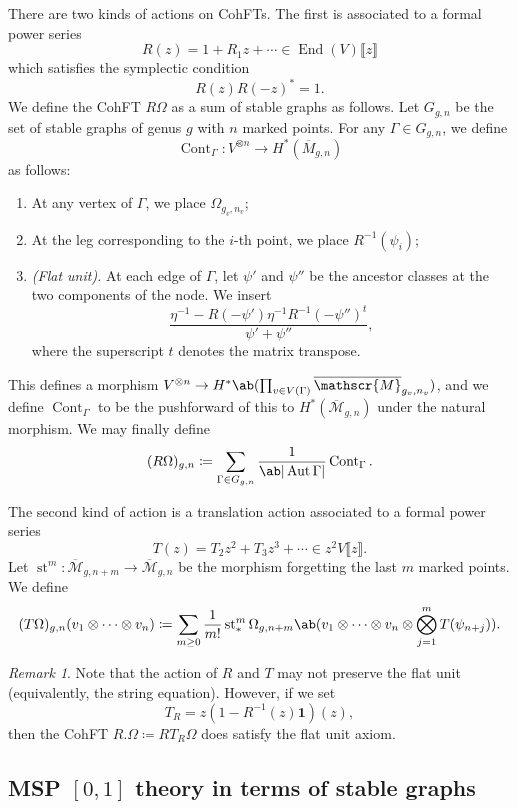 \documentclass[10pt]{amsart}
\theoremstyle{definition}
\theoremstyle{remark}
\newtheorem{rmk}[thm]{Remark}
\theoremstyle{plain}
\theoremstyle{definition}
\theoremstyle{remark}
\newcommand{\msc}[1]{\mathscr{#1}}
\newcommand{\mbf}[1]{\mathbf{#1}}
\newcommand{\on}[1]{\operatorname{#1}}
\newcommand{\ol}[1]{\overline{#1}}
\newcommand{\1}{\mathbf{1}}
\newcommand{\2}{\mathbf{2}}
\newcommand{\3}{\mathbf{3}}
\newcommand{\ps}[1]{\llbracket #1 \rrbracket}
\DeclareMathOperator{\End}{End}
\DeclareMathOperator{\Aut}{Aut}
\numberwithin{equation}{section}
\begin{document}
There are two kinds of actions on CohFTs. The first is associated to a formal power series
\[ R(z) = 1 + R_1 z + \cdots \in \End(V) \ps{z} \]
which satisfies the symplectic condition
\[ R(z) R(-z)^* = 1. \]
We define the CohFT $R \Omega$ as a sum of stable graphs as follows. Let $G_{g,n}$ be the set of stable graphs of genus $g$ with $n$ marked points. For any $\Gamma \in G_{g,n}$, we define
\[ \on{Cont}_{\Gamma} \colon V^{\otimes n} \to H^*(\ol{M}_{g,n}) \]
as follows:
\begin{enumerate}
    \item At any vertex of $\Gamma$, we place $\Omega_{g_v, n_v}$;
    \item At the leg corresponding to the $i$-th point, we place $R^{-1}(\psi_i)$;
    \item \textit{(Flat unit).} At each edge of $\Gamma$, let $\psi'$ and $\psi''$ be the ancestor classes at the two components of the node. We insert
        \[ \frac{\eta^{-1} - R(-\psi') \eta^{-1} R^{-1}(-\psi'')^t}{\psi' + \psi''}, \]
        where the superscript $t$ denotes the matrix transpose.
\end{enumerate}
This defines a morphism $V^{\otimes n} \to H^*\ab(\prod_{v \in V(\Gamma)} \ol{\msc{M}}_{g_v, n_v})$, and we define $\on{Cont}_{\Gamma}$ to be the pushforward of this to $H^*(\ol{\msc{M}}_{g,n})$ under the natural morphism. We may finally define
\[ (R\Omega)_{g,n} \coloneqq \sum_{\Gamma \in G_{g,n}} \frac{1}{\ab|\Aut \Gamma|} \on{Cont}_{\Gamma}. \]

The second kind of action is a translation action associated to a formal power series
\[ T(z) = T_2 z^2 + T_3 z^3 + \cdots \in z^2 V\ps{z}. \]
Let $\on{st}^m \colon \ol{\msc{M}}_{g,n+m} \to \ol{\msc{M}}_{g,n}$ be the morphism forgetting the last $m$ marked points. We define
\[ (T\Omega)_{g,n}(v_1 \otimes \cdots \otimes v_n) \coloneqq \sum_{m \geq 0} \frac{1}{m!} \on{st}^m_{*} \Omega_{g,n+m} \ab(v_1 \otimes \cdots \otimes v_n \otimes \bigotimes_{j=1}^m T(\psi_{n+j})). \]

\begin{rmk}
    Note that the action of $R$ and $T$ may not preserve the flat unit (equivalently, the string equation). However, if we set
    \[ T_R = z(1-R^{-1}(z)\mbf{1})(z), \]
    then the CohFT $R.\Omega \coloneqq RT_R \Omega$ does satisfy the flat unit axiom.
\end{rmk}

\subsection{MSP $[0,1]$ theory in terms of stable graphs}%
\label{sub:MSP 01 theory in terms of stable graphs}
\end{document}

